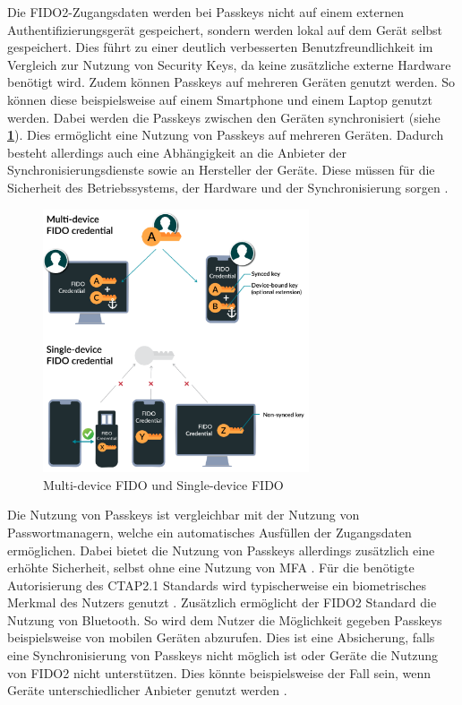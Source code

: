 Die FIDO2-Zugangsdaten werden bei Passkeys nicht auf einem externen Authentifizierungsgerät gespeichert, sondern werden lokal auf dem Gerät selbst gespeichert. Dies führt zu einer deutlich verbesserten Benutzfreundlichkeit im Vergleich zur Nutzung von Security Keys, da keine zusätzliche externe Hardware benötigt wird. Zudem können Passkeys auf mehreren Geräten genutzt werden. So können diese beispielsweise auf einem Smartphone und einem Laptop genutzt werden. Dabei werden die Passkeys zwischen den Geräten synchronisiert (siehe \textbf{\ref{passkeys-img}}). Dies ermöglicht eine Nutzung von Passkeys auf mehreren Geräten. Dadurch besteht allerdings auch eine Abhängigkeit an die Anbieter der Synchronisierungsdienste sowie an Hersteller der Geräte. Diese müssen für die Sicherheit des Betriebssystems, der Hardware und der Synchronisierung sorgen \cite{usecasfido}. 

\begin{figure}[h]
	\centering 
	\includegraphics[width=0.7\textwidth]{img/abbildungen/multi-device-fido2.png}
	\captionsetup{format=hang}
	\caption{Multi-device FIDO und Single-device FIDO \cite{usecasfido}} \label{passkeys-img}
\end{figure}

Die Nutzung von Passkeys ist vergleichbar mit der Nutzung von Passwortmanagern, welche ein automatisches Ausfüllen der Zugangsdaten ermöglichen. Dabei bietet die Nutzung von Passkeys allerdings zusätzlich eine erhöhte Sicherheit, selbst ohne eine Nutzung von \ac{MFA} \cite{usecasfido} \cite{passkeysgoogle}. Für die benötigte Autorisierung des CTAP2.1 Standards wird typischerweise ein biometrisches Merkmal des Nutzers genutzt \cite{usecasfido}. Zusätzlich ermöglicht der FIDO2 Standard die Nutzung von Bluetooth. So wird dem Nutzer die Möglichkeit gegeben Passkeys beispielsweise von mobilen Geräten abzurufen. Dies ist eine Absicherung, falls eine Synchronisierung von Passkeys nicht möglich ist oder Geräte die Nutzung von FIDO2 nicht unterstützen. Dies könnte beispielsweise der Fall sein, wenn Geräte unterschiedlicher Anbieter genutzt werden \cite{usecasfido}.

